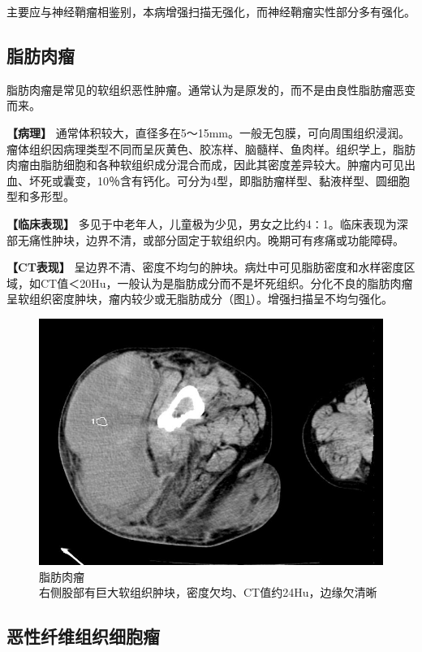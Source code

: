 主要应与神经鞘瘤相鉴别，本病增强扫描无强化，而神经鞘瘤实性部分多有强化。

\subsection{脂肪肉瘤}

脂肪肉瘤是常见的软组织恶性肿瘤。通常认为是原发的，而不是由良性脂肪瘤恶变而来。

\textbf{【病理】}
通常体积较大，直径多在5～15mm。一般无包膜，可向周围组织浸润。瘤体组织因病理类型不同而呈灰黄色、胶冻样、脑髓样、鱼肉样。组织学上，脂肪肉瘤由脂肪细胞和各种软组织成分混合而成，因此其密度差异较大。肿瘤内可见出血、坏死或囊变，10％含有钙化。可分为4型，即脂肪瘤样型、黏液样型、圆细胞型和多形型。

\textbf{【临床表现】}
多见于中老年人，儿童极为少见，男女之比约4∶1。临床表现为深部无痛性肿块，边界不清，或部分固定于软组织内。晚期可有疼痛或功能障碍。

\textbf{【CT表现】}
呈边界不清、密度不均匀的肿块。病灶中可见脂肪密度和水样密度区域，如CT值＜20Hu，一般认为是脂肪成分而不是坏死组织。分化不良的脂肪肉瘤呈软组织密度肿块，瘤内较少或无脂肪成分（图\ref{fig22-25}）。增强扫描呈不均匀强化。

\begin{figure}[!htbp]
 \centering
 \includegraphics[width=.7\textwidth,height=\textheight,keepaspectratio]{./images/Image00450.jpg}
 \captionsetup{justification=centering}
 \caption{脂肪肉瘤\\{\small 右侧股部有巨大软组织肿块，密度欠均、CT值约24Hu，边缘欠清晰}}
 \label{fig22-25}
  \end{figure} 

\subsection{恶性纤维组织细胞瘤}

